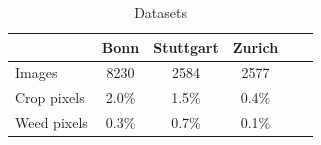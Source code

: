 \documentclass[letterpaper, 10 pt, conference]{ieeeconf}  %
\begin{document}
    \begin{table}
        \centering
        \caption{Datasets}
        \begin{tabular}{@{}lccccc@{}} 
            \toprule
              & Bonn & Stuttgart & Zurich \\ 
            \midrule 
    		  Images  & 8230 & 2584 & 2577 \\ \addlinespace
    		  Crop pixels & 2.0\% & 1.5\% & 0.4\%  \\ \addlinespace
    		  Weed pixels & 0.3\% & 0.7\% & 0.1\%  \\    
            \bottomrule
        \end{tabular}
        \label{tab:datasets_stats}
    \end{table}
    
    
    
\end{document}
